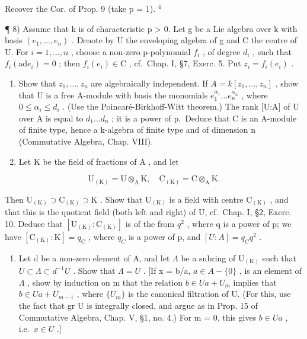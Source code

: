 Recover the Cor. of Prop. 9 (take p = 1). \(^{4}\)

¶ 8) Assume that k is of characteristic p \textgreater{} 0. Let g be a Lie algebra over k with basis \((e_{1},\ldots,e_{n})\) . Denote by U the enveloping algebra of g and C the centre of U. For \(i = 1,\ldots,n\) , choose a non-zero p-polynomial \(f_{i}\) , of degree \(d_{i}\) , such that \(f_{i}(\mathrm{ad}e_{i}) = 0\) ; then \(f_{i}(e_{i}) \in \mathrm{C}\) , cf.~Chap. I, §7, Exerc. 5. Put \(z_{i} = f_{i}(e_{i})\) .

\begin{enumerate}
\def\labelenumi{\alph{enumi})}
\item
  Show that \(z_{1},\ldots,z_{n}\) are algebraically independent. If \(A=k[z_{1},\ldots,z_{n}]\) , show that U is a free A-module with basis the monomials \(e_{1}^{\alpha_{1}}\ldots e_{n}^{\alpha_{n}}\) , where \(0\leq\alpha_{i}\leq d_{i}\) . (Use the Poincaré-Birkhoff-Witt theorem.) The rank {[}U:A{]} of U over A is equal to \(d_{1}\ldots d_{n}\) ; it is a power of p.~Deduce that C is an A-module of finite type, hence a k-algebra of finite type and of dimension n (Commutative Algebra, Chap. VIII).
\item
  Let \(\mathrm{K}\) be the field of fractions of \(\mathrm{A}\) , and let
\end{enumerate}

\[
\mathrm{U} _ {(\mathrm{K})} = \mathrm{U} \otimes_ {\mathrm{A}} \mathrm{K}, \quad \mathrm{C} _ {(\mathrm{K})} = \mathrm{C} \otimes_ {\mathrm{A}} \mathrm{K}.
\]

Then \(\mathrm{U}_{(\mathrm{K})}\supset\mathrm{C}_{(\mathrm{K})}\supset\mathrm{K}\) . Show that \(\mathrm{U}_{(\mathrm{K})}\) is a field with centre \(\mathrm{C}_{(\mathrm{K})}\) , and that this is the quotient field (both left and right) of U, cf.~Chap. I, §2, Exerc. 10. Deduce that \([\mathrm{U}_{(\mathrm{K})}:\mathrm{C}_{(\mathrm{K})}]\) is of the from \(q^{2}\) , where q is a power of p; we have \([\mathrm{C}_{(\mathrm{K})}:\mathrm{K}]=q_{\mathrm{C}}\) , where \(q_{C}\) is a power of p, and \([U:A]=q_{C}q^{2}\) .

\begin{enumerate}
\def\labelenumi{\alph{enumi})}
\setcounter{enumi}{2}
\tightlist
\item
  Let d be a non-zero element of A, and let \(\Lambda\) be a subring of \(\mathrm{U}_{(\mathrm{K})}\) such that \(U \subset \Lambda \subset d^{-1}U\) . Show that \(\Lambda = U\) . {[}If x = b/a, \(a \in A - \{0\}\) , is an element of \(\Lambda\) , show by induction on m that the relation \(b \in Ua + U_m\) implies that \(b \in Ua + U_{m-1}\) , where \(\{U_m\}\) is the canonical filtration of U. (For this, use the fact that gr U is integrally closed, and argue as in Prop. 15 of Commutative Algebra, Chap. V, §1, no. 4.) For m = 0, this gives \(b \in Ua\) , i.e.~\(x \in U\) .{]}
\end{enumerate}

